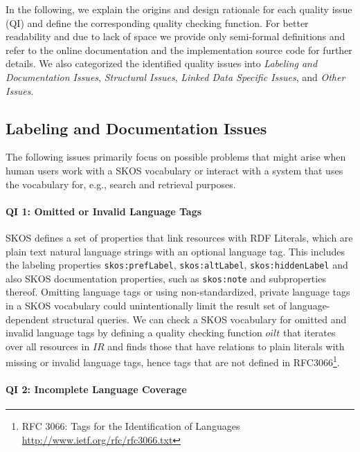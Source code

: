 In the following, we explain the origins and design rationale for each quality issue (QI) and define the corresponding quality checking function. For better readability and due to lack of space we provide only semi-formal definitions and refer to the online documentation and the implementation source code for further details. We also categorized the identified quality issues into \emph{Labeling and Documentation Issues}, \emph{Structural Issues}, \emph{Linked Data Specific Issues}, and \emph{Other Issues}. 



\subsection{Labeling and Documentation Issues}

The following issues primarily focus on possible problems that might arise when human users work with a SKOS vocabulary or interact with a system that uses the vocabulary for, e.g., search and retrieval purposes.

\paragraph{QI 1: Omitted or Invalid Language Tags}

SKOS defines a set of properties that link resources with RDF Literals, which are plain text natural language strings with an optional language tag. This includes the labeling properties \texttt{skos:prefLabel}, \texttt{skos:altLabel}, \texttt{skos:hiddenLabel} and also SKOS documentation properties, such as \texttt{skos:note} and subproperties thereof. Omitting language tags or using non-standardized, private language tags in a SKOS vocabulary could unintentionally limit the result set of language-dependent structural queries.
We can check a SKOS vocabulary for omitted and invalid language tags by defining a quality checking function $oilt$ that iterates over all resources in $IR$ and finds those that have relations to plain literals with missing or invalid language tags, hence tags that are not defined in RFC3066\footnote{RFC 3066: Tags for the Identification of Languages \url{http://www.ietf.org/rfc/rfc3066.txt}}.

\paragraph{QI 2: Incomplete Language Coverage}

